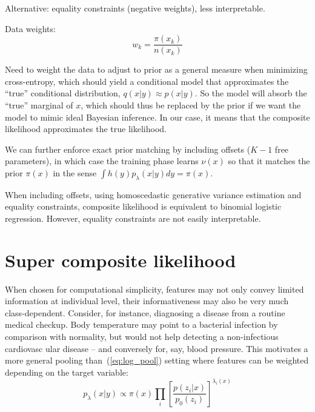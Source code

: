 \documentclass[english]{scrartcl}
\begin{document}
Alternative: equality constraints (negative weights), less interpretable.

Data weights: 
$$
w_k = \frac{\pi(x_k)}{n(x_k)}
$$

Need to weight the data to adjust to prior as a general measure when minimizing cross-entropy, which should yield a conditional model that approximates the ``true'' conditional distribution, $q(x|y)\approx p(x|y)$. So the model will absorb the ``true'' marginal of $x$, which should thus be replaced by the prior if we want the model to mimic ideal Bayesian inference. In our case, it means that the composite likelihood approximates the true likelihood.

We can further enforce exact prior matching by including offsets ($K-1$ free parameters), in which case the training phase learns $\nu(x)$ so that it matches the prior $\pi(x)$ in the sense $\int h(y)p_\lambda(x|y)dy = \pi(x)$.

When including offsets, using homoscedastic generative variance estimation and equality constraints, composite likelihood is equivalent to binomial logistic regression. However, equality constraints are not easily interpretable.




\section{Super composite likelihood}
\label{sec:super}

When chosen for computational simplicity, features may not only convey limited information at individual level, their informativeness may also be very much class-dependent. Consider, for instance, diagnosing a disease from a routine medical checkup. Body temperature may point to a bacterial infection by comparison with normality, but would not help detecting a non-infectious cardiovasc ular disease -- and conversely for, say, blood pressure. This motivates a more general pooling than~(\ref{eq:log_pool}) setting where features can be weighted depending on the target variable:
$$
p_\lambda(x|y) \propto \pi(x) \prod_i \left[\frac{p(z_i|x)}{p_0(z_i)}\right]^{\lambda_i(x)}
$$
\end{document}
